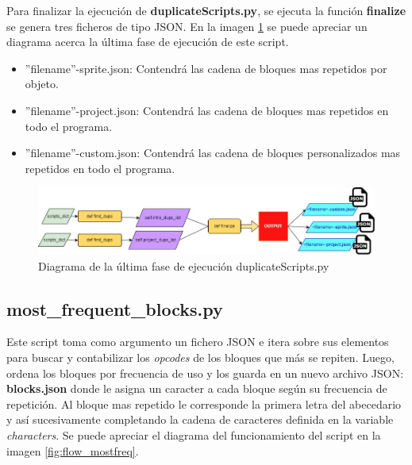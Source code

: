 \documentclass[a4paper, 12pt]{book}
\begin{document}
Para finalizar la ejecución de \textbf{duplicateScripts.py}, se ejecuta la función \textbf{finalize} se genera tres ficheros de tipo JSON. En la imagen \ref{fig:flow_finddups} se puede apreciar un diagrama acerca la última fase de ejecución de este script.

\begin{itemize}
\item ''filename''-sprite.json: Contendrá las cadena de bloques mas repetidos por objeto.
\item ''filename''-project.json: Contendrá las cadena de bloques mas repetidos en todo el programa.
\item ''filename''-custom.json: Contendrá las cadena de bloques personalizados mas repetidos en todo el programa.
\end{itemize}

\begin{figure}[!htb]
  \centering
  \includegraphics[width=17cm, keepaspectratio]{img/flow_duplicate.jpg}
  \caption{Diagrama de la última fase de ejecución duplicateScripts.py}
  \label{fig:flow_finddups}
\end{figure}

\subsection{most\_frequent\_blocks.py}

Este script toma como argumento un fichero JSON e itera sobre sus elementos para buscar y contabilizar los \textit{opcodes} de los bloques que más se repiten. Luego, ordena los bloques por frecuencia de uso y los guarda en un nuevo archivo JSON: \textbf{blocks.json} donde le asigna un caracter a cada bloque según su frecuencia de repetición. Al bloque mas repetido le corresponde la primera letra del abecedario y así sucesivamente completando la cadena de caracteres definida en la variable \textit{characters}. Se puede apreciar el diagrama del funcionamiento del script en la imagen \ref{fig:flow_mostfreq}.


\end{document}
